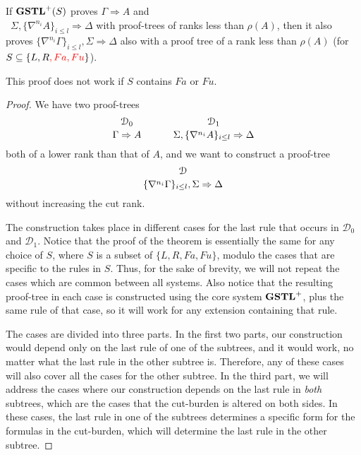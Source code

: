\begin{thm}\label{thm:gstl-cut-reduction}
  If $\mathbf{GSTL}^+(S)$ proves $\Gamma \Rightarrow A$ and\\\ $\Sigma , \{\nabla^{n_i} A\}_{i \leq l} \Rightarrow \Delta$ with proof-trees of ranks less than $\rho(A)$, then it also proves $\{\nabla^{n_i} \Gamma\}_{i \leq l} , \Sigma \Rightarrow \Delta$ also with a proof tree of a rank less than $\rho(A)$ (for $S \subseteq \{L, R{\color{red}, Fa, Fu}\}$).

  {\color{red} This proof does not work if $S$ contains $Fa$ or $Fu$.}
  \end{thm}
  \begin{proof}
    We have two proof-trees
    \[
      \genfrac{}{}{0pt}{}{\mathcal{D}_0}{\Gamma \Rightarrow A}
      \hspace{3em}
      \genfrac{}{}{0pt}{}{\mathcal{D}_1}{\Sigma , \{\nabla^{n_i} A\}_{i \leq l} \Rightarrow \Delta}
    \]
    both of a lower rank than that of $A$, and we want to construct a proof-tree
    \[\genfrac{}{}{0pt}{}{\mathcal{D}}{\{\nabla^{n_i} \Gamma\}_{i \leq l} , \Sigma \Rightarrow \Delta} \]
    without increasing the cut rank.
  
    The construction takes place in different cases for the last rule that occurs in $\mathcal{D}_0$ and $\mathcal{D}_1$. Notice that the proof of the theorem is essentially the same for any choice of $S$, where $S$ is a subset of $\{L, R, Fa, Fu\}$, modulo the cases that are specific to the rules in $S$. Thus, for the sake of brevity, we will not repeat the cases which are common between all systems. Also notice that the resulting proof-tree in each case is constructed using the core system $\mathbf{GSTL}^+$, plus the same rule of that case, so it will work for any extension containing that rule.
  
    The cases are divided into three parts. In the first two parts, our construction would depend only on the last rule of one of the subtrees, and it would work, no matter what the last rule in the other subtree is. Therefore, any of these cases will also cover all the cases for the other subtree. In the third part, we will address the cases where our construction depends on the last rule in \emph{both} subtrees, which are the cases that the cut-burden is altered on both sides. In these cases, the last rule in one of the subtrees determines a specific form for the formulas in the cut-burden, which will determine the last rule in the other subtree.
  

\end{proof}
